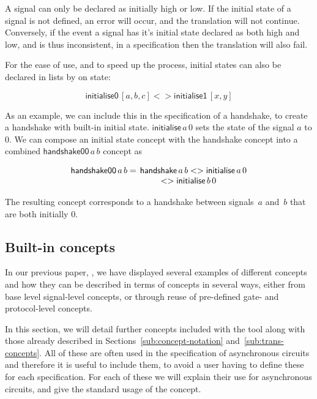 \documentclass[british,conference,compsoc]{IEEEtran}
\begin{document}
\noindent A signal can only be declared as initially high or low. If the 
initial state of a signal is not defined, an error will occur, and the 
translation will not continue. Conversely, if the event a signal has it's 
initial state declared as both high and low, and is thus inconsistent, in a 
specification then the translation will also fail.

For the ease of use, and to speed up the process, initial states can also be 
declared in lists by on state:

\[
\mathsf{initialise0}\, [a, b, c] <> \mathsf{initialise1}\, [x, y]
\]


\noindent As an example, we can include this in the specification of a 
handshake, to create a handshake with built-in initial state.
$\mathsf{initialise}\,a\, 0$ sets the state of the signal
$a$ to $0$. We can compose an initial state concept with the handshake concept
into a combined $\mathsf{handshake00}\,a\, b$ concept as

\[
\begin{array}{lcl}
\mathsf{handshake00}\, a\, b =&\hspace{-2mm}\mathsf{handshake}\,a\, b 
	<> \mathsf{initialise}\,a\, 0 \\
&\hspace{-6mm}<> \mathsf{initialise}\,b\, 0
\end{array}
\]

The resulting concept corresponds to a handshake between signals~$a$
and~$b$ that are both initially $0$.


\subsection{Built-in concepts \label{sub:built-in}}

In our previous paper, \cite{2015_Beaumont_MEMOCODE}, we have displayed several
examples of different concepts and how they can be described in terms of 
concepts in several ways, either from base level signal-level concepts, or 
through reuse of pre-defined gate- and protocol-level concepts.

In this section, we will detail further concepts included with the tool along 
with those already described in Sections~\ref{sub:concept-notation} 
and~\ref{sub:trans-concepts}. All of these are often used in the specification 
of asynchronous circuits and therefore it is useful to include them, to avoid a 
user having to define these for each specification. For each of these we will 
explain their use for asynchronous circuits, and give the standard usage of the 
concept. 
\end{document}
